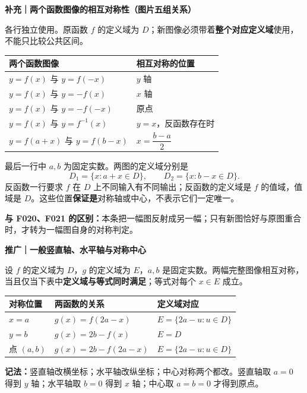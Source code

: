 \begin{statementbox}
\textbf{补充｜两个函数图像的相互对称性（图片五组关系）}

各行独立使用。原函数 $f$ 的定义域为 $D$；新图像必须带着\textbf{整个对应定义域}使用，不能只比较公共区间。
\begin{center}\renewcommand{\arraystretch}{1.45}
\begin{tabular}{p{.57\linewidth}|p{.28\linewidth}}
两个函数图像 & 相互对称的位置\\\hline
$y=f(x)$ 与 $y=f(-x)$ & $y$ 轴\\
$y=f(x)$ 与 $y=-f(x)$ & $x$ 轴\\
$y=f(x)$ 与 $y=-f(-x)$ & 原点\\
$y=f(x)$ 与 $y=f^{-1}(x)$ & $y=x$，反函数存在时\\
$y=f(a+x)$ 与 $y=f(b-x)$ & $x=\dfrac{b-a}{2}$
\end{tabular}\end{center}
最后一行中 $a,b$ 为固定实数。两图的定义域分别是
\[D_1=\{x:a+x\in D\},\qquad D_2=\{x:b-x\in D\}.\]
反函数一行要求 $f$ 在 $D$ 上不同输入有不同输出；反函数的定义域是 $f$ 的值域，值域是 $D$。这些位置\textbf{保证是}对称轴或中心，不表示它们一定唯一。

\textbf{与 F020、F021 的区别：}本条把一幅图反射成另一幅；只有新图恰好与原图重合时，才转为一幅图自身的对称判定。

\end{statementbox}
\clearpage
\begin{statementbox}
\textbf{推广｜一般竖直轴、水平轴与对称中心}

设 $f$ 的定义域为 $D$，$g$ 的定义域为 $E$，$a,b$ 是固定实数。两幅完整图像相互对称，当且仅当下表中\textbf{定义域与等式同时满足}；等式对每个 $x\in E$ 成立。
\begin{center}\renewcommand{\arraystretch}{1.5}
\begin{tabular}{p{.17\linewidth}|p{.37\linewidth}|p{.30\linewidth}}
对称位置 & 两函数的关系 & 定义域对应\\\hline
$x=a$ & $g(x)=f(2a-x)$ & $E=\{2a-u:u\in D\}$\\
$y=b$ & $g(x)=2b-f(x)$ & $E=D$\\
点 $(a,b)$ & $g(x)=2b-f(2a-x)$ & $E=\{2a-u:u\in D\}$
\end{tabular}\end{center}
\textbf{记法：}竖直轴改横坐标；水平轴改纵坐标；中心对称两个都改。竖直轴取 $a=0$ 得到 $y$ 轴；水平轴取 $b=0$ 得到 $x$ 轴；中心取 $a=b=0$ 才得到原点。


\end{statementbox}


